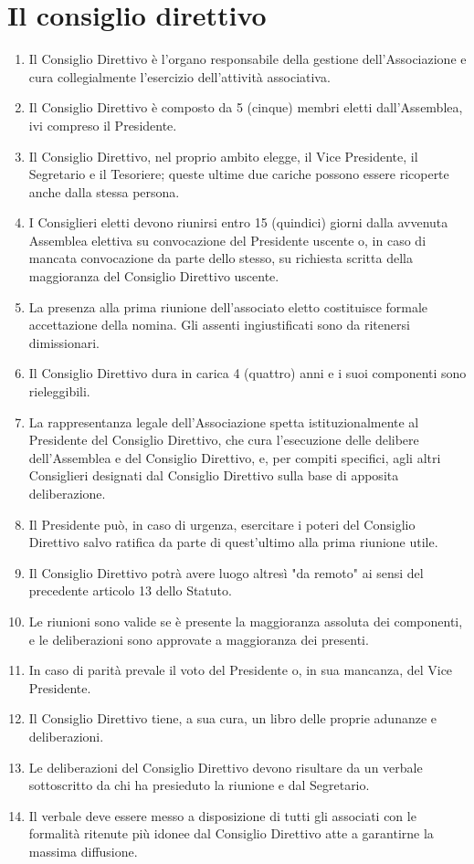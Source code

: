 \documentclass{djtsdoc}
\begin{document}
	\section{Il consiglio direttivo}
	\begin{enumerate}
		\item Il Consiglio Direttivo è l'organo responsabile della gestione dell'Associazione e cura collegialmente l'esercizio dell'attività associativa.
		\item Il Consiglio Direttivo è composto da 5 (cinque) membri eletti dall'Assemblea, ivi compreso il Presidente.
		\item Il Consiglio Direttivo, nel proprio ambito elegge, il Vice Presidente, il Segretario e il Tesoriere; queste ultime due cariche possono essere ricoperte anche dalla stessa persona.
		\item I Consiglieri eletti devono riunirsi entro 15 (quindici) giorni dalla avvenuta Assemblea elettiva su convocazione del Presidente uscente o, in caso di mancata convocazione da parte dello stesso, su richiesta scritta della maggioranza del Consiglio Direttivo uscente.
		\item La presenza alla prima riunione dell'associato eletto costituisce formale accettazione della nomina. Gli assenti ingiustificati sono da ritenersi dimissionari.
		\item Il Consiglio Direttivo dura in carica 4 (quattro) anni e i suoi componenti sono rieleggibili.
		\item La rappresentanza legale dell'Associazione spetta istituzionalmente al Presidente del Consiglio Direttivo, che cura l'esecuzione delle delibere  dell'Assemblea e del Consiglio Direttivo, e, per compiti specifici, agli altri Consiglieri designati dal Consiglio Direttivo sulla base di apposita deliberazione.
		\item Il Presidente può, in caso di urgenza, esercitare i poteri del Consiglio Direttivo salvo ratifica da parte di quest'ultimo alla prima riunione utile.
		\item Il Consiglio Direttivo potrà avere luogo altresì "da remoto" ai sensi del precedente articolo 13 dello Statuto.
		\item Le riunioni sono valide se è presente la maggioranza assoluta dei componenti, e le deliberazioni sono approvate a maggioranza dei presenti.
		\item In caso di parità prevale il voto del Presidente o, in sua mancanza, del Vice Presidente.
		\item Il Consiglio Direttivo tiene, a sua cura, un libro delle proprie adunanze e deliberazioni.
		\item Le deliberazioni del Consiglio Direttivo devono risultare da un verbale sottoscritto da chi ha presieduto la riunione e dal Segretario.
		\item Il verbale deve essere messo a disposizione di tutti gli associati con le formalità ritenute più idonee dal Consiglio Direttivo atte a garantirne la massima diffusione.
	\end{enumerate}
	
\end{document}
